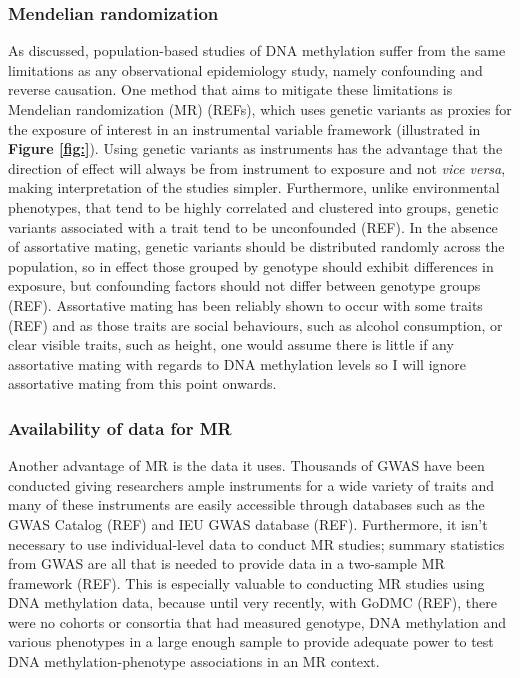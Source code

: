 \documentclass[11pt,twoside]{bristolthesis}
\begin{document}
\hypertarget{mendelian-randomization}{%
\subsubsection{Mendelian randomization}\label{mendelian-randomization}}

As discussed, population-based studies of DNA methylation suffer from the same limitations as any observational epidemiology study, namely confounding and reverse causation. One method that aims to mitigate these limitations is Mendelian randomization (MR) (REFs), which uses genetic variants as proxies for the exposure of interest in an instrumental variable framework (illustrated in \textbf{Figure \ref{fig:}}). Using genetic variants as instruments has the advantage that the direction of effect will always be from instrument to exposure and not \emph{vice versa}, making interpretation of the studies simpler. Furthermore, unlike environmental phenotypes, that tend to be highly correlated and clustered into groups, genetic variants associated with a trait tend to be unconfounded (REF). In the absence of assortative mating, genetic variants should be distributed randomly across the population, so in effect those grouped by genotype should exhibit differences in exposure, but confounding factors should not differ between genotype groups (REF). Assortative mating has been reliably shown to occur with some traits (REF) and as those traits are social behaviours, such as alcohol consumption, or clear visible traits, such as height, one would assume there is little if any assortative mating with regards to DNA methylation levels so I will ignore assortative mating from this point onwards.

\hypertarget{availability-of-data-for-mr}{%
\subsubsection{Availability of data for MR}\label{availability-of-data-for-mr}}

Another advantage of MR is the data it uses. Thousands of GWAS have been conducted giving researchers ample instruments for a wide variety of traits and many of these instruments are easily accessible through databases such as the GWAS Catalog (REF) and IEU GWAS database (REF). Furthermore, it isn't necessary to use individual-level data to conduct MR studies; summary statistics from GWAS are all that is needed to provide data in a two-sample MR framework (REF). This is especially valuable to conducting MR studies using DNA methylation data, because until very recently, with GoDMC (REF), there were no cohorts or consortia that had measured genotype, DNA methylation and various phenotypes in a large enough sample to provide adequate power to test DNA methylation-phenotype associations in an MR context.
\end{document}
